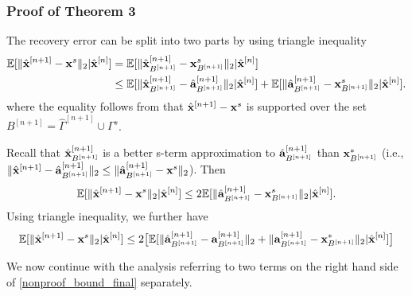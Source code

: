 \documentclass[11pt]{article}
\begin{document}
\subsubsection{Proof of Theorem 3}
The recovery error can be split into two parts by using triangle inequality
\begin{equation}\label{main_theorem}
\begin{split}
   \mathbb{E}[ \|\hat{{\bf x}}^{[n+1]} - {\bf x}^s \|_2 | \hat{{\bf x}}^{[n]}] &= \mathbb{E}[\|\hat{{\bf x}}_{B^{[n+1]}}^{[n+1]} - {\bf x}_{B^{[n+1]}}^s \|_2| \hat{{\bf x}}^{[n]}] \\
    &\leq \mathbb{E}[\|\hat{{\bf x}}_{B^{[n+1]}}^{[n+1]} - \hat{{\bf a}}_{B^{[n+1]}}^{[n+1]} \|_2| \hat{{\bf x}}^{[n]}] + \mathbb{E}[\|\hat{{\bf a}}_{B^{[n+1]}}^{[n+1]} - {\bf x}_{B^{[n+1]}}^s \|_2| \hat{{\bf x}}^{[n]}].
    \end{split}
\end{equation}
where the equality follows from that $\hat{{\bf x}}^{[n+1]} - {\bf x}^s$ is supported over the set $B^{[n+1]} = \hat{\Gamma}^{[n+1]} \cup \Gamma^s$.

Recall that $\hat{{\bf x}}_{B^{[n+1]}}^{[n+1]}$ is a better s-term approximation to $\hat{{\bf a}}_{B^{[n+1]}}^{[n+1]}$ than ${\bf x}_{B^{[n+1]}}^{*}$ (i.e., $\|\hat{{\bf x}}^{[n+1]} - \hat{{\bf a}}_{B^{[n+1]}}^{[n+1]} \|_2\leq \| \hat{{\bf a}}_{B^{[n+1]}}^{[n+1]} - {\bf x}^s \|_2$). Then 
\begin{equation}
    \mathbb{E}[\|\hat{{\bf x}}^{[n+1]} - {\bf x}^s \|_2| \hat{{\bf x}}^{[n]}] \leq 2\mathbb{E}[ \|\hat{{\bf a}}_{B^{[n+1]}}^{[n+1]} - {\bf x}_{B^{[n+1]}}^s \|_2 | \hat{{\bf x}}^{[n]}].
\end{equation}
Using triangle inequality, we further have
\begin{equation}\label{nonproof_bound_final}
    \mathbb{E}[\|\hat{{\bf x}}^{[n+1]} - {\bf x}^s \|_2| \hat{{\bf x}}^{[n]}]\leq 2 \big [\mathbb{E}[\|\hat{{\bf a}}_{B^{[n+1]}}^{[n+1]} - {{\bf a}}_{B^{[n+1]}}^{[n+1]} \|_2  + \|{{\bf a}}_{B^{[n+1]}}^{[n+1]} - {{\bf x}}_{B^{[n+1]}}^{*} \|_2 | \hat{{\bf x}}^{[n]}]\big ]
\end{equation}

We now continue with the analysis referring to two terms on the right hand side of \ref{nonproof_bound_final} separately.\\
\end{document}
